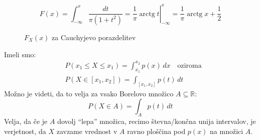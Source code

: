 \documentclass[12pt]{book}
\def\n{\noindent}
\theoremstyle{definition}
\theoremstyle{plain}
\theoremstyle{plain}
\theoremstyle{plain}
\theoremstyle{remark}
\begin{document}
\begin{enumerate}
    $$
    F(x)=\int_{-\infty}^x \frac{d t}{\pi\left(1+t^2\right)}=\left.\frac{1}{\pi} \operatorname{arctg} t\right|_{-\infty} ^x=\frac{1}{\pi} \operatorname{arctg} x+\frac{1}{2}
    $$

    \begin{figure}[H]
        \centering

        \caption{$F_X(x)$ za Cauchyjevo porazdelitev}
        \label{fig:19}
    \end{figure}
\end{enumerate}

\n Imeli smo:
$$
\begin{aligned}
    & P\left(x_1 \leq X \leq x_1\right)=\int_{x_1}^{x_2} p(x) \, d x \quad \text {oziroma} \\
    & P\left(X \in\left[x_1, x_2\right]\right)=\int_{\left[x_1, x_2\right]} p(t) \, d t 
\end{aligned}
$$
Možno je videti, da to velja za vsako Borelovo množico $A \subseteq \mathbb{R}$:
$$
P(X \in A)=\int_A p(t) \, d t
$$
Velja, da če je $A$ dovolj \enquote{lepa} množica, recimo števna/končna unija intervalov, je verjetnost, da $X$ zavzame vrednost v $A$ ravno ploščina pod $p(x)$ na množici $A$. 
\end{document}
